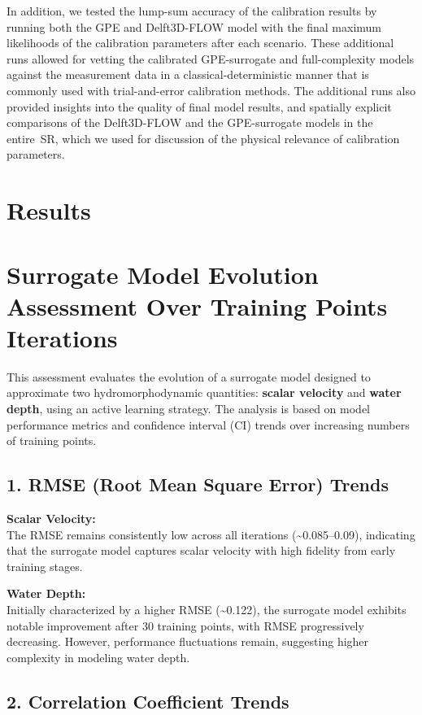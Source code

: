 \documentclass[draft,linenumbers,onecolumn]{agujournal2019} %
\begin{document}
In addition, we tested the lump-sum accuracy of the calibration results by running both the GPE and Delft3D-FLOW model with the final maximum likelihoods of the calibration parameters after each scenario. These additional runs allowed for vetting the calibrated GPE-surrogate and full-complexity models against the measurement data in a classical-deterministic manner that is commonly used with trial-and-error calibration methods. The additional runs also provided insights into the quality of final model results, and spatially explicit comparisons of the Delft3D-FLOW and the GPE-surrogate models in the entire~SR, which we used for discussion of the physical relevance of calibration parameters.

\section{Results}
\label{Results}
\section*{Surrogate Model Evolution Assessment Over Training Points Iterations}

This assessment evaluates the evolution of a surrogate model designed to approximate two hydromorphodynamic quantities: \textbf{scalar velocity} and \textbf{water depth}, using an active learning strategy. The analysis is based on model performance metrics and confidence interval (CI) trends over increasing numbers of training points.

\subsection*{1. RMSE (Root Mean Square Error) Trends}

\textbf{Scalar Velocity:} \\
The RMSE remains consistently low across all iterations (\textasciitilde0.085–0.09), indicating that the surrogate model captures scalar velocity with high fidelity from early training stages.

\textbf{Water Depth:} \\
Initially characterized by a higher RMSE (\textasciitilde0.122), the surrogate model exhibits notable improvement after 30 training points, with RMSE progressively decreasing. However, performance fluctuations remain, suggesting higher complexity in modeling water depth.

\subsection*{2. Correlation Coefficient Trends}
\end{document}

